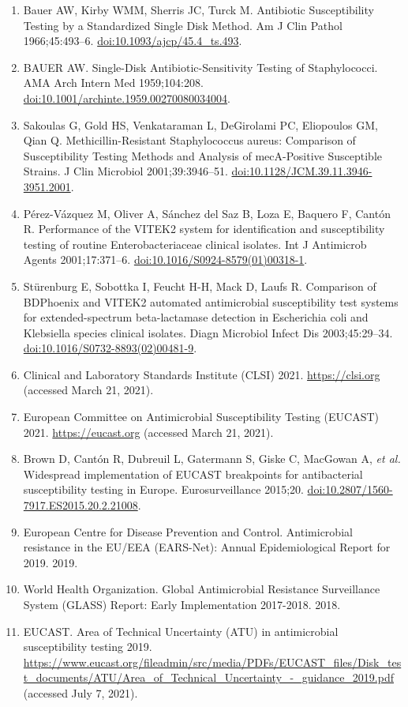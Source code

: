 \documentclass[
]{book}
\begin{document}
\begin{enumerate}
\item
  Bauer AW, Kirby WMM, Sherris JC, Turck M. Antibiotic Susceptibility Testing by a Standardized Single Disk Method. Am J Clin Pathol 1966;45:493--6. \url{doi:10.1093/ajcp/45.4_ts.493}.
\item
  BAUER AW. Single-Disk Antibiotic-Sensitivity Testing of Staphylococci. AMA Arch Intern Med 1959;104:208. \url{doi:10.1001/archinte.1959.00270080034004}.
\item
  Sakoulas G, Gold HS, Venkataraman L, DeGirolami PC, Eliopoulos GM, Qian Q. Methicillin-Resistant Staphylococcus aureus: Comparison of Susceptibility Testing Methods and Analysis of mecA-Positive Susceptible Strains. J Clin Microbiol 2001;39:3946--51. \url{doi:10.1128/JCM.39.11.3946-3951.2001}.
\item
  Pérez-Vázquez M, Oliver A, Sánchez del Saz B, Loza E, Baquero F, Cantón R. Performance of the VITEK2 system for identification and susceptibility testing of routine Enterobacteriaceae clinical isolates. Int J Antimicrob Agents 2001;17:371--6. \url{doi:10.1016/S0924-8579(01)00318-1}.
\item
  Stürenburg E, Sobottka I, Feucht H-H, Mack D, Laufs R. Comparison of BDPhoenix and VITEK2 automated antimicrobial susceptibility test systems for extended-spectrum beta-lactamase detection in Escherichia coli and Klebsiella species clinical isolates. Diagn Microbiol Infect Dis 2003;45:29--34. \url{doi:10.1016/S0732-8893(02)00481-9}.
\item
  Clinical and Laboratory Standards Institute (CLSI) 2021. \url{https://clsi.org} (accessed March 21, 2021).
\item
  European Committee on Antimicrobial Susceptibility Testing (EUCAST) 2021. \url{https://eucast.org} (accessed March 21, 2021).
\item
  Brown D, Cantón R, Dubreuil L, Gatermann S, Giske C, MacGowan A, \emph{et al.} Widespread implementation of EUCAST breakpoints for antibacterial susceptibility testing in Europe. Eurosurveillance 2015;20. \url{doi:10.2807/1560-7917.ES2015.20.2.21008}.
\item
  European Centre for Disease Prevention and Control. Antimicrobial resistance in the EU/EEA (EARS-Net): Annual Epidemiological Report for 2019. 2019.
\item
  World Health Organization. Global Antimicrobial Resistance Surveillance System (GLASS) Report: Early Implementation 2017-2018. 2018.
\item
  EUCAST. Area of Technical Uncertainty (ATU) in antimicrobial susceptibility testing 2019. \url{https://www.eucast.org/fileadmin/src/media/PDFs/EUCAST_files/Disk_test_documents/ATU/Area_of_Technical_Uncertainty_-_guidance_2019.pdf} (accessed July 7, 2021).

\end{enumerate}
\end{document}
